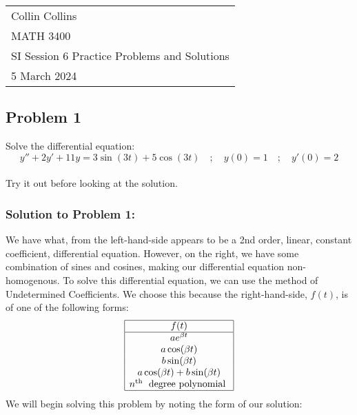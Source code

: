 \documentclass[a4paper,12pt]{article} %
\begin{document}



\thispagestyle{empty} %

\begin{tabular}{p{15.5cm}} %
\\ Collin Collins \\
MATH 3400\\
SI Session 6 Practice Problems and Solutions\\
5 March 2024 \\
\hline %

\end{tabular} 

\subsection*{Problem 1} Solve the differential equation:
$$ y'' + 2y' + 11y = 3\sin(3t) + 5\cos(3t) \quad ; \quad y(0)=1 \quad;\quad y'\left(0\right)=2 $$
\\
 
Try it out before looking at the solution.
\pagebreak
 
 \subsubsection*{Solution to Problem 1:}
 We have what, from the left-hand-side appears to be a 2nd order, linear, constant coefficient, differential equation. However, on the right, we have some combination of sines and cosines, making our differential equation non-homogenous. To solve this differential equation, we can use the method of Undetermined Coefficients. We choose this because the right-hand-side, $f(t)$, is of one of the following forms:
 $$ \begin{array}{|c|}
\hline f(t) \\
\hline a e^{\beta t} \\
a \cos (\beta t) \\
b \sin (\beta t) \\
a \cos (\beta t)+b \sin (\beta t) \\
n^{\text {th }} \text { degree polynomial } \\
\hline 
\end{array} $$
We will begin solving this problem by noting the form of our solution: 
\end{document}
